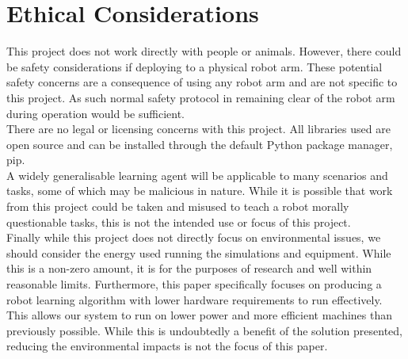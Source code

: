 \section{Ethical Considerations}
This project does not work directly with people or animals. However, there could be safety considerations if deploying to a physical robot arm. These potential safety concerns are a consequence of using any robot arm and are not specific to this project. As such normal safety protocol in remaining clear of the robot arm during operation would be sufficient.\\

There are no legal or licensing concerns with this project. All libraries used are open source and can be installed through the default Python package manager, pip.\\

A widely generalisable learning agent will be applicable to many scenarios and tasks, some of which may be malicious in nature. While it is possible that work from this project could be taken and misused to teach a robot morally questionable tasks, this is not the intended use or focus of this project.\\

Finally while this project does not directly focus on environmental issues, we should consider the energy used running the simulations and equipment. While this is a non-zero amount, it is for the purposes of research and well within reasonable limits. Furthermore, this paper specifically focuses on producing a robot learning algorithm with lower hardware requirements to run effectively. This allows our system to run on lower power and more efficient machines than previously possible. While this is undoubtedly a benefit of the solution presented, reducing the environmental impacts is not the focus of this paper.